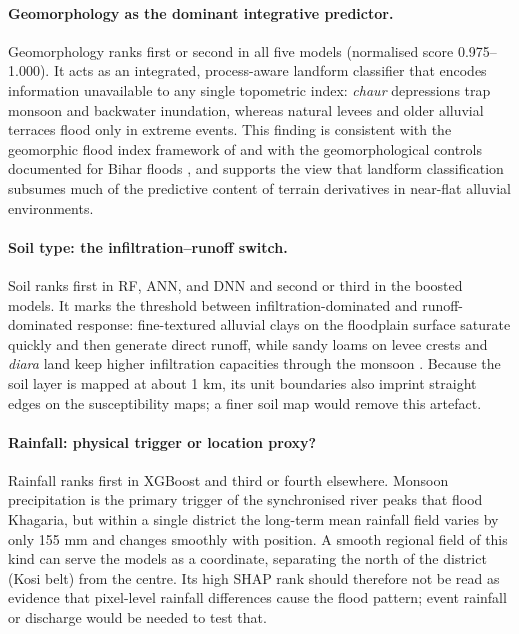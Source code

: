 \documentclass[12pt, a4paper]{article}
\begin{document}
\paragraph{Geomorphology as the dominant integrative predictor.}
Geomorphology ranks first or second in all five models (normalised score 0.975--1.000). It acts as an integrated, process-aware landform classifier that encodes information unavailable to any single topometric index: \textit{chaur} depressions trap monsoon and backwater inundation, whereas natural levees and older alluvial terraces flood only in extreme events. This finding is consistent with the geomorphic flood index framework of \citet{samela2017} and with the geomorphological controls documented for Bihar floods \citep{sinha2008}, and supports the view that landform classification subsumes much of the predictive content of terrain derivatives in near-flat alluvial environments.

\paragraph{Soil type: the infiltration--runoff switch.}
Soil ranks first in RF, ANN, and DNN and second or third in the boosted models. It marks the threshold between infiltration-dominated and runoff-dominated response: fine-textured alluvial clays on the floodplain surface saturate quickly and then generate direct runoff, while sandy loams on levee crests and \textit{diara} land keep higher infiltration capacities through the monsoon \citep{NBSSLUPbihar2020}. Because the soil layer is mapped at about 1 km, its unit boundaries also imprint straight edges on the susceptibility maps; a finer soil map would remove this artefact.

\paragraph{Rainfall: physical trigger or location proxy?}
Rainfall ranks first in XGBoost and third or fourth elsewhere. Monsoon precipitation is the primary trigger of the synchronised river peaks that flood Khagaria, but within a single district the long-term mean rainfall field varies by only 155 mm and changes smoothly with position. A smooth regional field of this kind can serve the models as a coordinate, separating the north of the district (Kosi belt) from the centre. Its high SHAP rank should therefore not be read as evidence that pixel-level rainfall differences cause the flood pattern; event rainfall or discharge would be needed to test that.
\end{document}
